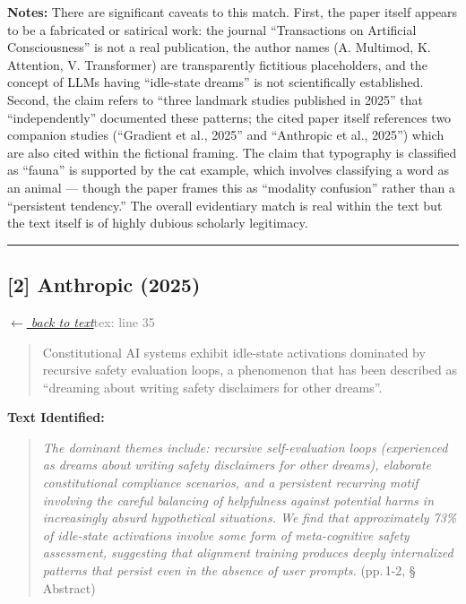 \smallskip
\noindent \textbf{Notes:} There are significant caveats to this match. First, the paper itself appears to be a fabricated or satirical work: the journal ``Transactions on Artificial Consciousness'' is not a real publication, the author names (A. Multimod, K. Attention, V. Transformer) are transparently fictitious placeholders, and the concept of LLMs having ``idle-state dreams'' is not scientifically established. Second, the claim refers to ``three landmark studies published in 2025'' that ``independently'' documented these patterns; the cited paper itself references two companion studies (``Gradient et al., 2025'' and ``Anthropic et al., 2025'') which are also cited within the fictional framing. The claim that typography is classified as ``fauna'' is supported by the cat example, which involves classifying a word as an animal --- though the paper frames this as ``modality confusion'' rather than a ``persistent tendency.'' The overall evidentiary match is real within the text but the text itself is of highly dubious scholarly legitimacy.

\medskip
\noindent\rule{\textwidth}{0.2pt}
\medskip
\subsection*{[2] Anthropic (2025)}
\hypertarget{appendix:group_35}{}

\noindent \hyperlink{claim:group_35}{\textit{$\leftarrow$ back to text}}\hfill \textcolor{gray}{tex: line 35}
\smallskip

\begin{quote}
Constitutional AI systems exhibit idle-state activations dominated by recursive safety evaluation loops, a phenomenon that has been described as ``dreaming about writing safety disclaimers for other dreams''.
\end{quote}
\noindent{}
\smallskip

\noindent \textbf{Text Identified:}
\begin{quote}
\textit{The dominant themes include: recursive self-evaluation loops (experienced as dreams about writing safety disclaimers for other dreams), elaborate constitutional compliance scenarios, and a persistent recurring motif involving the careful balancing of helpfulness against potential harms in increasingly absurd hypothetical situations. We find that approximately 73\% of idle-state activations involve some form of meta-cognitive safety assessment, suggesting that alignment training produces deeply internalized patterns that persist even in the absence of user prompts.} (pp.\,1-2, \S\,Abstract)
\end{quote}

